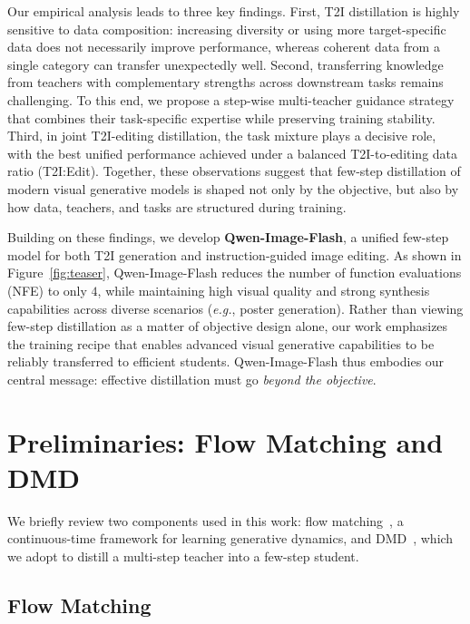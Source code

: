 \documentclass{article}
\newcommand{\eg}{\emph{e.g.}}    %
\begin{document}
Our empirical analysis leads to three key findings. First, T2I distillation is highly sensitive to data composition: increasing diversity or using more target-specific data does not necessarily improve performance, whereas coherent data from a single category can transfer unexpectedly well. Second, transferring knowledge from teachers with complementary strengths across downstream tasks remains challenging. To this end, we propose a step-wise multi-teacher guidance strategy that combines their task-specific expertise while preserving training stability. Third, in joint T2I-editing distillation, the task mixture plays a decisive role, with the best unified performance achieved under a balanced T2I-to-editing data ratio (T2I:Edit). Together, these observations suggest that few-step distillation of modern visual generative models is shaped not only by the objective, but also by how data, teachers, and tasks are structured during training.


Building on these findings, we develop \textbf{Qwen-Image-Flash}, a unified few-step model for both T2I generation and instruction-guided image editing. As shown in Figure~\ref{fig:teaser}, Qwen-Image-Flash reduces the number of function evaluations (NFE) to only $4$, while maintaining high visual quality and strong synthesis capabilities across diverse scenarios (\eg, poster generation). Rather than viewing few-step distillation as a matter of objective design alone, our work emphasizes the training recipe that enables advanced visual generative capabilities to be reliably transferred to efficient students. Qwen-Image-Flash thus embodies our central message: effective distillation must go \textit{beyond the objective}.






\section{Preliminaries: Flow Matching and DMD}

We briefly review two components used in this work: flow matching~\citep{lipman2022flow}, a continuous-time framework for learning generative dynamics, and DMD~\citep{yin2024improved}, which we adopt to distill a multi-step teacher into a few-step student.

\subsection{Flow Matching}
\end{document}
